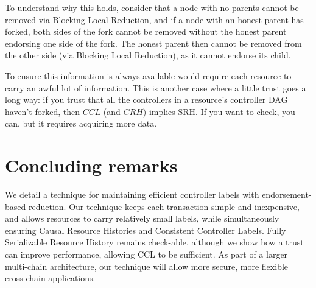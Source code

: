 \documentclass[a4paper,USenglish,cleveref, autoref, thm-restate, anonymous]{lipics-v2021}
\begin{document}
To understand why this holds, consider that a node with no parents cannot be removed via Blocking Local Reduction, and if a node with an honest parent has forked, both sides of the fork cannot be removed without the honest parent endorsing one side of the fork.
The honest parent then cannot be removed from the other side (via Blocking Local Reduction), as it cannot endorse its child. 

To ensure this information is always available would require each resource to carry an awful lot of information.
This is another case where a little trust goes a long way: if you trust that all the controllers in a resource's controller DAG haven't forked, then $CCL$ (and $CRH$) implies SRH.
If you want to check, you can, but it requires acquiring more data.














 
\section{Concluding remarks}
We detail a technique for maintaining efficient controller labels with endorsement-based reduction.
Our technique keeps each transaction simple and inexpensive, and allows resources to carry relatively small labels, while simultaneously ensuring Causal Resource Histories and Consistent Controller Labels.
Fully Serializable Resource History remains check-able, although we show how a trust can improve performance, allowing CCL to be sufficient.
As part of a larger multi-chain architecture, our technique will allow more secure, more flexible cross-chain applications.
\end{document}

